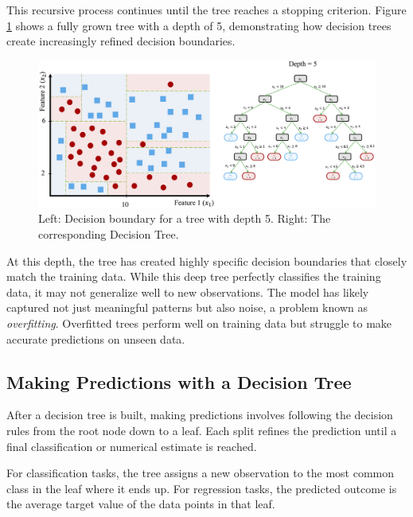 \documentclass[
  11pt,
]{book}
\theoremstyle{definition}
\theoremstyle{definition}
\theoremstyle{definition}
\theoremstyle{definition}
\theoremstyle{remark}
\begin{document}
This recursive process continues until the tree reaches a stopping criterion. Figure \ref{fig:tree-4} shows a fully grown tree with a depth of 5, demonstrating how decision trees create increasingly refined decision boundaries.

\begin{figure}[H]

{\centering \includegraphics[width=1\linewidth]{images/ch11_ex_tree_4} 

}

\caption{Left: Decision boundary for a tree with depth 5. Right: The corresponding Decision Tree.}\label{fig:tree-4}
\end{figure}

At this depth, the tree has created highly specific decision boundaries that closely match the training data. While this deep tree perfectly classifies the training data, it may not generalize well to new observations. The model has likely captured not just meaningful patterns but also noise, a problem known as \emph{overfitting}. Overfitted trees perform well on training data but struggle to make accurate predictions on unseen data.

\subsection*{Making Predictions with a Decision Tree}\label{making-predictions-with-a-decision-tree}


After a decision tree is built, making predictions involves following the decision rules from the root node down to a leaf. Each split refines the prediction until a final classification or numerical estimate is reached.

For classification tasks, the tree assigns a new observation to the most common class in the leaf where it ends up. For regression tasks, the predicted outcome is the average target value of the data points in that leaf.
\end{document}
